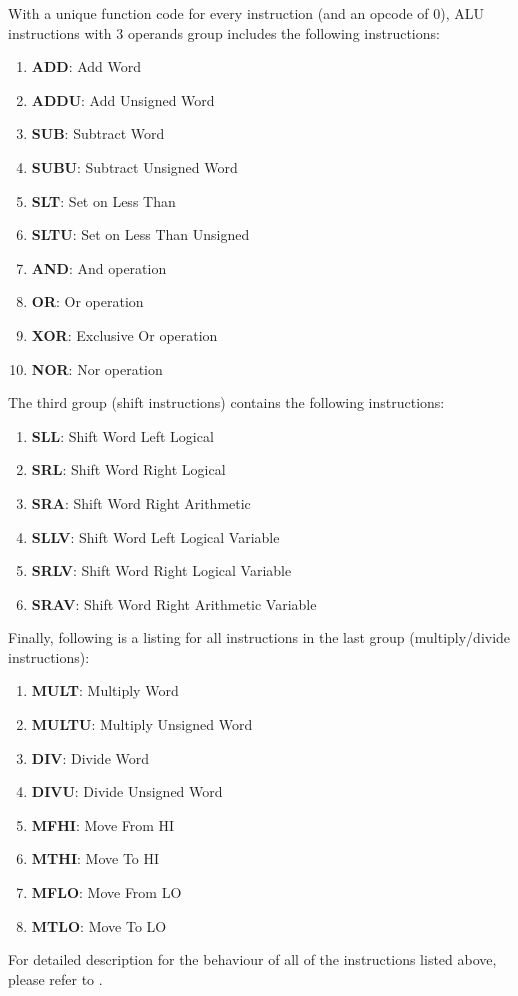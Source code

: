 \documentclass[oneside]{book}
\begin{document}
\begin{itemize}
With a unique function code for every instruction (and an opcode of 0),
ALU instructions with 3 operands group includes the following instructions:

\begin{enumerate}

\item \textbf{ADD}:  Add Word
\item \textbf{ADDU}: Add Unsigned Word
\item \textbf{SUB}:  Subtract Word
\item \textbf{SUBU}: Subtract Unsigned Word
\item \textbf{SLT}:  Set on Less Than
\item \textbf{SLTU}: Set on Less Than Unsigned
\item \textbf{AND}:  And operation
\item \textbf{OR}:   Or operation
\item \textbf{XOR}:  Exclusive Or operation
\item \textbf{NOR}:  Nor operation

\end{enumerate}

The third group (shift instructions) contains the following instructions:

\begin{enumerate}

\item \textbf{SLL}:  Shift Word Left Logical
\item \textbf{SRL}:  Shift Word Right Logical
\item \textbf{SRA}:  Shift Word Right Arithmetic
\item \textbf{SLLV}: Shift Word Left Logical Variable
\item \textbf{SRLV}: Shift Word Right Logical Variable
\item \textbf{SRAV}: Shift Word Right Arithmetic Variable

\end{enumerate}

Finally, following is a listing for all instructions in the last
group (multiply/divide instructions):

\begin{enumerate}

\item \textbf{MULT}:  Multiply Word
\item \textbf{MULTU}: Multiply Unsigned Word
\item \textbf{DIV}:   Divide Word
\item \textbf{DIVU}:  Divide Unsigned Word
\item \textbf{MFHI}:  Move From HI
\item \textbf{MTHI}:  Move To HI
\item \textbf{MFLO}:  Move From LO
\item \textbf{MTLO}:  Move To LO

\end{enumerate}

For detailed description for the behaviour of all of the instructions listed
above, please refer to \cite{mips_isa}.

\end{itemize}
\end{document}
